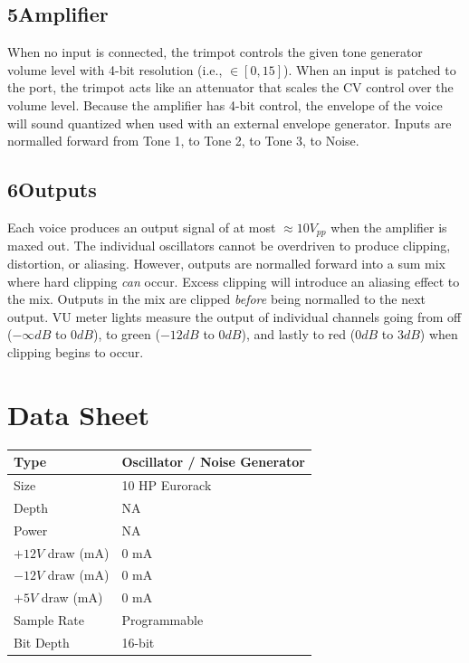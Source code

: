 \documentclass[12pt,letter]{article}
\begin{document}
\subsection*{5{\quad}Amplifier}

When no input is connected, the trimpot controls the given tone generator volume level with 4-bit resolution (i.e., $\in [0, 15]$). When an input is patched to the port, the trimpot acts like an attenuator that scales the CV control over the volume level. Because the amplifier has 4-bit control, the envelope of the voice will sound quantized when used with an external envelope generator. Inputs are normalled forward from Tone 1, to Tone 2, to Tone 3, to Noise.

\subsection*{6{\quad}Outputs}

Each voice produces an output signal of at most ${\approx}10V_{pp}$ when the amplifier is maxed out. The individual oscillators cannot be overdriven to produce clipping, distortion, or aliasing. However, outputs are normalled forward into a sum mix where hard clipping \textit{can} occur. Excess clipping will introduce an aliasing effect to the mix. Outputs in the mix are clipped \textit{before} being normalled to the next output. VU meter lights measure the output of individual channels going from off ($-\infty dB$ to $0dB$), to green ($-12dB$ to $0dB$), and lastly to red ($0dB$ to $3dB$) when clipping begins to occur.


\clearpage
\section*{Data Sheet}

\begin{table}[!htp]
\begin{tabular}{|l|l|}
\hline
Type             & Oscillator / Noise Generator  \\
\hline
Size             & 10 HP Eurorack           \\
\hline
Depth            & NA                       \\
\hline
Power            & NA                       \\ %
\hline
$+12V$ draw (mA) & 0 mA                     \\
\hline
$-12V$ draw (mA) & 0 mA                     \\
\hline
$+5V$ draw (mA)  & 0 mA                     \\
\hline
Sample Rate      & Programmable             \\
\hline
Bit Depth        & 16-bit                   \\
\hline
\end{tabular}
\end{table}


\clearpage
\renewcommand\refname{References \& Acknowledgments}
\nocite{*}


\end{document}
